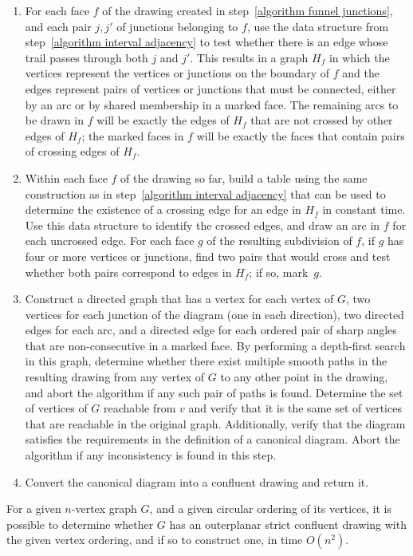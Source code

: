 \documentclass{llncs}
\begin{document}
\begin{enumerate}
\item For each face $f$ of the drawing created in step~\ref{algorithm funnel junctions}, and each pair $j,j'$ of junctions belonging to $f$, use the data structure from step~\ref{algorithm interval adjacency} to test whether there is an edge whose trail passes through both $j$ and $j'$. This results in a graph $H_f$ in which the vertices represent the vertices or junctions on the boundary of $f$ and the edges represent pairs of vertices or junctions that must be connected, either by an arc or by shared membership in a marked face. The remaining arcs to be drawn in $f$ will be exactly the edges of $H_f$ that are not crossed by other edges of $H_f$; the marked faces in $f$ will be exactly the faces that contain pairs of crossing edges of $H_f$.
\item Within each face $f$ of the drawing so far, build a table using the same construction as in step~\ref{algorithm interval adjacency} that can be used to determine the existence of a crossing edge for an edge in $H_f$ in constant time. Use this data structure to identify the crossed edges, and draw an arc in $f$ for each uncrossed edge. For each face $g$ of the resulting subdivision of $f$, if $g$ has four or more vertices or junctions, find two pairs that would cross and test whether both pairs correspond to edges in $H_f$; if so, mark~$g$.
\item Construct a directed graph that has a vertex for each vertex of $G$, two vertices for each junction of the diagram (one in each direction), two directed edges for each arc, and a directed edge for each ordered pair of sharp angles that are non-consecutive in a marked face. By performing a depth-first search in this graph, determine whether there exist multiple smooth paths in the resulting drawing from any vertex of $G$ to any other point in the drawing, and abort the algorithm if any such pair of paths is found. Determine the set of vertices of $G$ reachable from $v$ and verify that it is the same set of vertices that are reachable in the original graph. Additionally, verify that the diagram satisfies the requirements in the definition of a canonical diagram. Abort the algorithm if any inconsistency is found in this step.
\item Convert the canonical diagram into a confluent drawing and return it.
\end{enumerate}

\begin{theorem}
For a given $n$-vertex graph $G$, and a given circular ordering of its vertices, it is possible to determine whether $G$ has an outerplanar strict confluent drawing with the given vertex ordering, and if so to construct one, in time $O(n^2)$.
\end{theorem}
\end{document}
